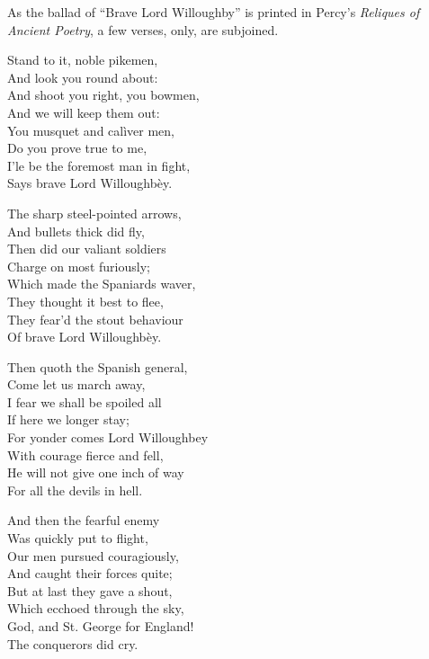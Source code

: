As the ballad of “Brave Lord Willoughby” is printed in Percy’s \textit{Reliques of
Ancient Poetry}, a few verses, only, are subjoined.
\pagebreak


\noindent\begin{minipage}{\textwidth}

\end{minipage}

\settowidth{\versewidth}{For yonder comes Lord Willoughbey}
\begin{dcverse}
\begin{altverse}
Stand to it, noble pikemen,\\
And look you round about:\\
And shoot you right, you bowmen,\\
And we will keep them out:\\
You musquet and calìver men,\\
Do you prove true to me,\\
I’le be the foremost man in fight,\\
Says brave Lord Willoughbèy.
\end{altverse}

\begin{altverse}
The sharp steel-pointed arrows,\\
And bullets thick did fly,\\
Then did our valiant soldiers\\
Charge on most furiously;\\
Which made the Spaniards waver,\\
They thought it best to flee,\\
They fear’d the stout behaviour\\
Of brave Lord Willoughbèy.
\end{altverse}

\begin{altverse}
Then quoth the Spanish general,\\
Come let us march away,\\
I fear we shall be spoiled all\\
If here we longer stay;\\
For yonder comes Lord Willoughbey\\
With courage fierce and fell,\\
He will not give one inch of way\\
For all the devils in hell.
\end{altverse}

\begin{altverse}
And then the fearful enemy\\
Was quickly put to flight,\\
Our men pursued couragiously,\\
And caught their forces quite;\\
But at last they gave a shout,\\
Which ecchoed through the sky,\\
God, and St. George for England!\\
The conquerors did cry.
\end{altverse}
\end{dcverse}
\pagebreak

